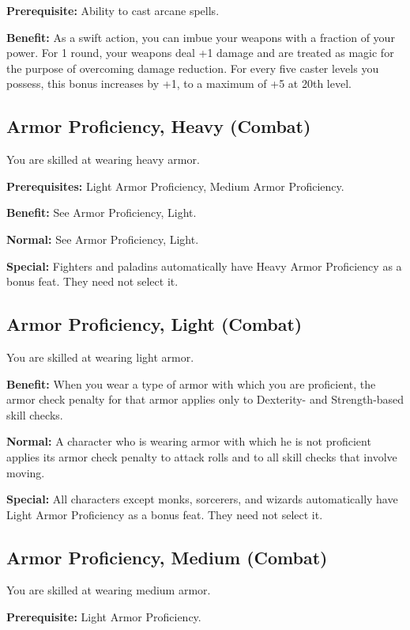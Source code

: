 \textbf{Prerequisite:} Ability to cast arcane spells.
				
\textbf{Benefit:} As a swift action, you can imbue your weapons with a fraction of your power. For 1 round, your weapons deal +1 damage and are treated as magic for the purpose of overcoming damage reduction. For every five caster levels you possess, this bonus increases by +1, to a maximum of +5 at 20th level.
				
\subsection{Armor Proficiency, Heavy (Combat)}

				
You are skilled at wearing heavy armor.
				
\textbf{Prerequisites:} Light Armor Proficiency, Medium Armor Proficiency.
				
\textbf{Benefit:} See Armor Proficiency, Light.
				
\textbf{Normal:} See Armor Proficiency, Light.
				
\textbf{Special:} Fighters and paladins automatically have Heavy Armor Proficiency as a bonus feat. They need not select it.
				
\subsection{Armor Proficiency, Light (Combat)}

				
You are skilled at wearing light armor.
				
\textbf{Benefit:} When you wear a type of armor with which you are proficient, the armor check penalty for that armor applies only to Dexterity- and Strength-based skill checks.
				
\textbf{Normal:} A character who is wearing armor with which he is not proficient applies its armor check penalty to attack rolls and to all skill checks that involve moving.
				
\textbf{Special:} All characters except monks, sorcerers, and wizards automatically have Light Armor Proficiency as a bonus feat. They need not select it.
				
\subsection{Armor Proficiency, Medium (Combat)}

				
You are skilled at wearing medium armor.
				
\textbf{Prerequisite:} Light Armor Proficiency.
				
